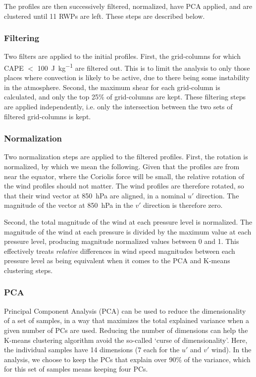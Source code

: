 \documentclass[11pt,a4paper]{article}
\newcommand\todo[1]{\textbf{TODO: #1}}
\begin{document}
The profiles are then successively filtered, normalized, have PCA applied, and are clustered until 11 RWPs are left. These steps are described below.

\subsubsection{Filtering}

Two filters are applied to the initial profiles. First, the grid-columns for which CAPE $<$ \SI{100}{J.kg^{-1}} are filtered out. This is to limit the analysis to only those places where convection is likely to be active, due to there being some instability in the atmosphere. Second, the maximum shear for each grid-column is calculated, and only the top 25\% of grid-columns are kept. These filtering steps are applied independently, i.e. only the intersection between the two sets of filtered grid-columns is kept.

\subsubsection{Normalization}

Two normalization steps are applied to the filtered profiles. First, the rotation is normalized, by which we mean the following. Given that the profiles are from near the equator, where the Coriolis force will be small, the relative rotation of the wind profiles should not matter. The wind profiles are therefore rotated, so that their wind vector at \SI{850}{hPa} are aligned, in a nominal $u'$ direction. The magnitude of the vector at \SI{850}{hPa} in the $v'$ direction is therefore zero. 

Second, the total magnitude of the wind at each pressure level is normalized. The magnitude of the wind at each pressure is divided by the maximum value at each pressure level, producing magnitude normalized values between 0 and 1. This effectively treats \textit{relative} differences in wind speed magnitudes between each pressure level as being equivalent when it comes to the PCA and K-means clustering steps.

\subsubsection{PCA}

Principal Component Analysis (PCA) can be used to reduce the dimensionality of a set of samples, in a way that maximizes the total explained variance when a given number of PCs are used. Reducing the number of dimensions can help the K-means clustering algorithm avoid the so-called `curse of dimensionality'. Here, the individual samples have 14 dimensions (7 each for the $u'$ and $v'$ wind). In the analysis, we choose to keep the PCs that explain over 90\% of the variance, which for this set of samples means keeping four PCs. 
\end{document}
